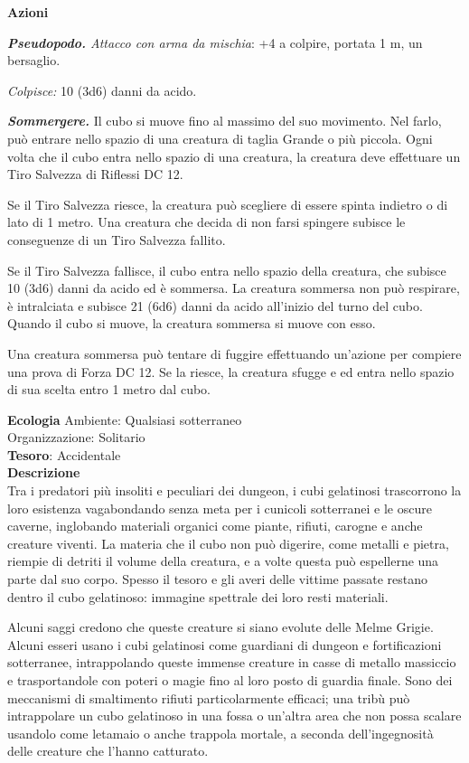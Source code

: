 \begin{multicols}{2}
	\textbf{Azioni}

	\textit{\textbf{Pseudopodo.} Attacco con arma da mischia}: +4 a colpire, portata 1 m, un bersaglio.

	\textit{Colpisce:} 10 (3d6) danni da acido.

	\textit{\textbf{Sommergere.}} Il cubo si muove fino al massimo del suo movimento. Nel farlo, può entrare nello spazio di una creatura di taglia Grande o più piccola. Ogni volta che il cubo entra nello spazio di una creatura, la creatura deve effettuare un Tiro Salvezza di Riflessi DC 12.

	Se il Tiro Salvezza riesce, la creatura può scegliere di essere spinta indietro o di lato di 1 metro. Una creatura che decida di non farsi spingere subisce le conseguenze di un Tiro Salvezza fallito.

	Se il Tiro Salvezza fallisce, il cubo entra nello spazio della creatura, che subisce 10 (3d6) danni da acido ed è sommersa. La creatura sommersa non può respirare, è intralciata e subisce 21 (6d6) danni da acido all'inizio del turno del cubo. Quando il cubo si muove, la creatura sommersa si muove con esso.

	Una creatura sommersa può tentare di fuggire effettuando un'azione per compiere una prova di Forza DC 12. Se la riesce, la creatura sfugge e ed entra nello spazio di sua scelta entro 1 metro dal cubo.

	\textbf{Ecologia}
	Ambiente: Qualsiasi sotterraneo\\
	Organizzazione: Solitario\\
	\textbf{Tesoro}: Accidentale\\
	\textbf{Descrizione}\\
	Tra i predatori più insoliti e peculiari dei dungeon, i cubi gelatinosi trascorrono la loro esistenza vagabondando senza meta per i cunicoli sotterranei e le oscure caverne, inglobando materiali organici come piante, rifiuti, carogne e anche creature viventi. La materia che il cubo non può digerire, come metalli e pietra, riempie di detriti il volume della creatura, e a volte questa può espellerne una parte dal suo corpo. Spesso il tesoro e gli averi delle vittime passate restano dentro il cubo gelatinoso: immagine spettrale dei loro resti materiali.

	Alcuni saggi credono che queste creature si siano evolute delle Melme Grigie. Alcuni esseri usano i cubi gelatinosi come guardiani di dungeon e fortificazioni sotterranee, intrappolando queste immense creature in casse di metallo massiccio e trasportandole con poteri o magie fino al loro posto di guardia finale. Sono dei meccanismi di smaltimento rifiuti particolarmente efficaci; una tribù può intrappolare un cubo gelatinoso in una fossa o un'altra area che non possa scalare usandolo come letamaio o anche trappola mortale, a seconda dell'ingegnosità delle creature che l'hanno catturato.


\end{multicols}
